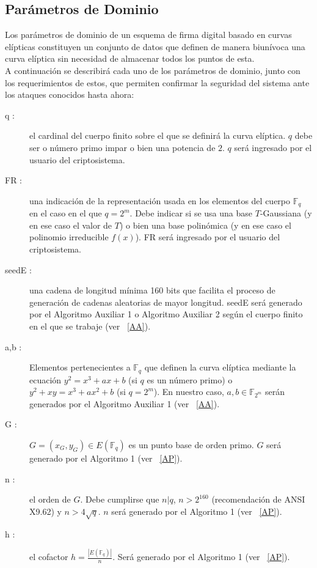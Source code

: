 \documentclass[11pt]{article}
\newcommand{\F}{\mathbb{F}}
\newcommand{\Fq}{\mathbb{F}_q}
\newcommand{\Fm}{\F_{2^m}}
\numberwithin{equation}{section} %
\numberwithin{figure}{section} %
\numberwithin{table}{section} %
\begin{document}
	\subsection{Parámetros de Dominio}

	Los parámetros de dominio de un esquema de firma digital basado en curvas elípticas constituyen un conjunto de datos que definen de manera biunívoca una curva elíptica sin necesidad de almacenar todos los puntos de esta.\\

	A continuación se describirá cada uno de los parámetros de dominio, junto con los requerimientos de estos, que permiten confirmar la seguridad del sistema ante los ataques conocidos hasta ahora:\\

	\begin{description}

		\item[q :] el cardinal del cuerpo finito sobre el que se definirá la curva elíptica. $q$ debe ser o número primo impar o bien una potencia de $2$. $q$ será ingresado por el usuario del criptosistema.%

		\item[FR :] una indicación de la representación usada en los elementos del cuerpo $\Fq$ en el caso en el que $q=2^m$. Debe indicar si se usa una base $T$-Gaussiana (y en ese caso el valor de $T$) o bien una base polinómica (y en ese caso el polinomio irreducible $f(x)$). FR será ingresado por el usuario del criptosistema.

		\item[seedE :] una cadena de longitud mínima 160 bits que facilita el proceso de generación de cadenas aleatorias de mayor longitud. seedE será generado por el Algoritmo Auxiliar 1 o Algoritmo Auxiliar 2 según el cuerpo finito en el que  se trabaje (ver ~\ref{AA}).

		\item[a,b :] Elementos pertenecientes a $\Fq$ que definen la curva elíptica mediante la ecuación $y^2=x^3+ax+b$ (si $q$ es un número primo) o $y^2+xy=x^3+ax^2+b$ (si $q=2^m$). En nuestro caso, $a,b\in\Fm$ serán generados por el Algoritmo Auxiliar 1 (ver ~\ref{AA}).

		\item[G :] $G=(x_G,y_G)\in E(\Fq)$ es un punto base de orden primo. $G$ será generado por el Algoritmo 1 (ver ~\ref{AP}).

		\item[n :]  el orden de $G$. Debe cumplirse que $n|q$, $n>2^{160}$ (recomendación de ANSI X9.62) y $n>4\sqrt{q}$. $n$ será generado por el Algoritmo 1 (ver ~\ref{AP}).

		\item[h :] el cofactor $h=\frac{|E(\Fq)|}{n}$. Será generado por el Algoritmo 1 (ver ~\ref{AP}).
	\end{description}
\end{document}
